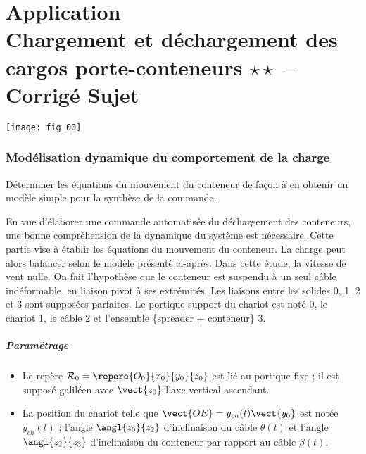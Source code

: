 \chapter*{Application  \\ 
Chargement et déchargement des cargos porte-conteneurs   $\star\star$
-- \ifprof Corrigé \else Sujet \fi}

\iflivret {} \else
\ifprof  {} \else \fi
\fi

\setcounter{question}{0}
\begin{marginfigure}
\texttt{[image: fig\_00]}
\end{marginfigure}


\subsection*{Modélisation dynamique du comportement de la charge}

\begin{obj}
Déterminer les équations du mouvement du conteneur de façon à en obtenir un modèle simple pour
la synthèse de la commande.
\end{obj}

\ifprof
\else
En vue d’élaborer une commande automatisée du déchargement des conteneurs, une bonne compréhension de
la dynamique du système est nécessaire. Cette partie vise à établir les équations du mouvement du conteneur.
La charge peut alors balancer selon le modèle présenté ci-après. Dans cette étude, la vitesse de vent nulle. On fait l'hypothèse que le conteneur est suspendu à un seul câble indéformable, en liaison pivot à ses extrémités. Les liaisons entre les solides 0, 1, 2 et 3 sont supposées parfaites.
Le portique support du chariot est noté 0, le chariot 1, le câble 2 et l’ensemble \{spreader + conteneur\} 3.

\paragraph*{Paramétrage}
\begin{itemize}
\item Le repère $\mathcal{R}_0=\repere{O_0}{x_0}{y_0}{z_0}$ est lié au portique fixe ; il est supposé
galiléen avec $\vect{z_0}$ l’axe vertical ascendant.
\item La position du chariot telle que $\vect{OE} = y_{ch}(t) \vect{y_0}$ est notée $y_{ch}(t)$ ;
l’angle $\angl{z_0}{z_2}$ d’inclinaison du câble $\theta(t)$ et l’angle $\angl{z_2}{z_3}$ d’inclinaison
du conteneur par rapport au câble  $\beta(t)$.
\end{itemize}

